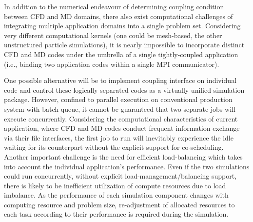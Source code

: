 \documentclass[conference,final]{IEEEtran}
\newcommand{\skonote}[1]{ {\textcolor{blue} { ***Jeff: #1 }}}
\newcommand{\skonote}[1]{}
\begin{document}
In addition to the numerical endeavour of determining coupling condition between CFD and MD domains, there also exist computational challenges of integrating multiple application domains into a single problem set. Considering very different computational kernels (one could be mesh-based, the other unstructured particle simulations), it is nearly impossible to incorporate distinct CFD and MD codes under the umbrella of a single tightly-coupled application (i.e., binding two application codes within a single MPI communicator).

One possible alternative will be to implement coupling interface on individual code and control these logically separated codes as a virtually unified simulation package.
However, confined to parallel execution on conventional production system with batch queue, it cannot be guaranteed that two separate jobs will execute concurrently. Considering the computational characteristics of current application, where CFD and MD codes conduct frequent information exchange via their file interfaces, the first job to run will inevitably experience the idle waiting for its counterpart without the explicit support for co-scheduling. Another important challenge is the need for efficient load-balancing which takes into account the individual application's performance. Even if the two simulations could run concurrently, without explicit load-management/balancing support, there is likely to be inefficient utilization of compute resources due to load imbalance. As the performance of each simulation component changes with computing resource and problem size, re-adjustment of allocated resources to each task according to their performance is required during the simulation.
\end{document}
